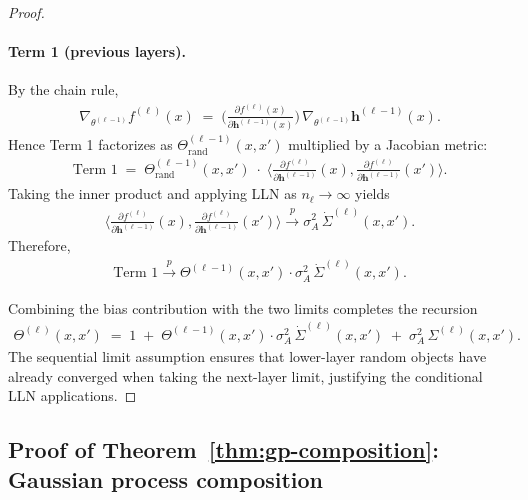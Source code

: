 \begin{proof}
\paragraph{Term 1 (previous layers).}
By the chain rule,
\begin{align}
\nabla_{\theta^{(\ell-1)}} f^{(\ell)}(x) \;=\; \Big(\frac{\partial f^{(\ell)}(x)}{\partial \bm{h}^{(\ell-1)}(x)}\Big)\,\nabla_{\theta^{(\ell-1)}} \bm{h}^{(\ell-1)}(x).
\end{align}
Hence Term 1 factorizes as \(\Theta^{(\ell-1)}_{\mathrm{rand}}(x,x')\) multiplied by a Jacobian metric:
\begin{align}
\text{Term 1} \;=\; \Theta^{(\ell-1)}_{\mathrm{rand}}(x,x')\;\cdot\;\Big\langle \frac{\partial f^{(\ell)}}{\partial \bm{h}^{(\ell-1)}}(x), \frac{\partial f^{(\ell)}}{\partial \bm{h}^{(\ell-1)}}(x') \Big\rangle.
\end{align}
Taking the inner product and applying LLN as \(n_\ell\to\infty\) yields
\begin{align}
\Big\langle \frac{\partial f^{(\ell)}}{\partial \bm{h}^{(\ell-1)}}(x), \frac{\partial f^{(\ell)}}{\partial \bm{h}^{(\ell-1)}}(x') \Big\rangle \xrightarrow{p} \sigma_A^2\,\dot{\Sigma}^{(\ell)}(x,x').
\end{align}
Therefore,
\begin{align}
\text{Term 1} \xrightarrow{p} \Theta^{(\ell-1)}(x,x')\cdot \sigma_A^2\,\dot{\Sigma}^{(\ell)}(x,x').
\end{align}

Combining the bias contribution with the two limits completes the recursion
\begin{align}
\Theta^{(\ell)}(x,x') \;=\; 1 \;+\; \Theta^{(\ell-1)}(x,x')\cdot\sigma_A^2\,\dot{\Sigma}^{(\ell)}(x,x') \;+\; \sigma_A^2\,\Sigma^{(\ell)}(x,x').
\end{align}
The sequential limit assumption ensures that lower-layer random objects have already converged when taking the next-layer limit, justifying the conditional LLN applications.
\end{proof}

\subsection{Proof of Theorem~\ref{thm:gp-composition}: Gaussian process composition}
\label{appendix:proof-gp-composition}

